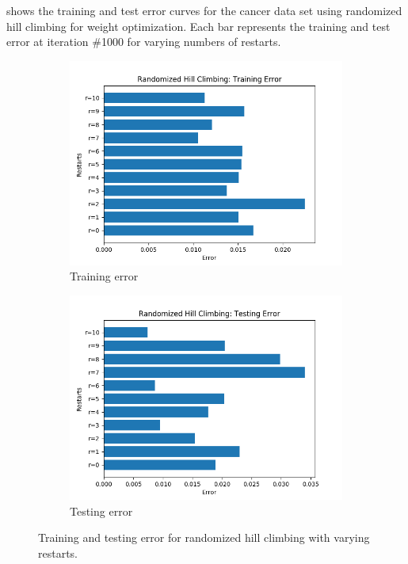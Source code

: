 \documentclass{article}
\begin{document}
         shows the training and test error curves for the cancer data set using randomized hill climbing for weight optimization. Each bar represents the training and test error at iteration \#1000 for varying numbers of restarts.

        \begin{figure}[htb]
        \centering

        \begin{subfigure}{0.5\textwidth}
          \includegraphics[width=\linewidth]{out/rhc/restarts-training.png}
          \caption{Training error}
          \label{fig:rhc-params-1}
        \end{subfigure}\hfil
        \begin{subfigure}{0.5\textwidth}
          \includegraphics[width=\linewidth]{out/rhc/restarts-testing.png}
          \caption{Testing error}
          \label{fig:rhc-params-2}
        \end{subfigure}

        \caption{Training and testing error for randomized hill climbing with varying restarts.}
        \label{fig:rhc-params}
        \end{figure}
\end{document}
